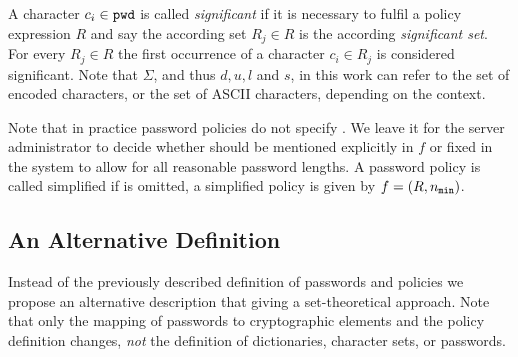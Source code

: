 \noindent
A character $c_i\in\mathtt{pwd}$ is called \emph{significant} if it is necessary to fulfil a policy expression $R$ and say the according set $R_j\in R$ is the according \emph{significant set}.
For every $R_j\in R$ the first occurrence of a character $c_i\in R_j$ is considered significant.
Note that $\Sigma$, and thus $d,u,l$ and $s$, in this work can refer to the set of encoded characters, or the set of \ac{ASCII}  characters, depending on the context.

\begin{remark}
Note that in practice password policies do not specify \pmax. 
We leave it for the server administrator to decide whether \pmax should be mentioned explicitly in $f$ or fixed in the system to allow for all reasonable password lengths.
A password policy is called simplified if \pmax is omitted, \ie a simplified policy is given by $f=(R,{n_\mathtt{min}})$.
\end{remark}


\subsection{An Alternative Definition}
Instead of the previously described definition of passwords and policies we propose an alternative description that giving a set-theoretical approach.
Note that only the mapping of passwords to cryptographic elements and the policy definition changes, \emph{not} the definition of dictionaries, character sets, or passwords.

